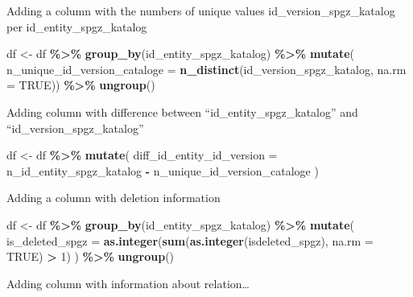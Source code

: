 \documentclass[
]{article}
\newenvironment{Shaded}{\begin{snugshade}}{\end{snugshade}}
\newcommand{\AttributeTok}[1]{\textcolor[rgb]{0.13,0.29,0.53}{#1}}
\newcommand{\ConstantTok}[1]{\textcolor[rgb]{0.56,0.35,0.01}{#1}}
\newcommand{\DecValTok}[1]{\textcolor[rgb]{0.00,0.00,0.81}{#1}}
\newcommand{\FunctionTok}[1]{\textcolor[rgb]{0.13,0.29,0.53}{\textbf{#1}}}
\newcommand{\NormalTok}[1]{#1}
\newcommand{\OtherTok}[1]{\textcolor[rgb]{0.56,0.35,0.01}{#1}}
\newcommand{\SpecialCharTok}[1]{\textcolor[rgb]{0.81,0.36,0.00}{\textbf{#1}}}
\begin{document}
Adding a column with the numbers of unique values
id\_version\_spgz\_katalog per id\_entity\_spgz\_katalog

\begin{Shaded}
\begin{Highlighting}[]
\NormalTok{df }\OtherTok{\textless{}{-}}\NormalTok{ df }\SpecialCharTok{\%\textgreater{}\%} 
  \FunctionTok{group\_by}\NormalTok{(id\_entity\_spgz\_katalog) }\SpecialCharTok{\%\textgreater{}\%} 
  \FunctionTok{mutate}\NormalTok{(}
    \AttributeTok{n\_unique\_id\_version\_cataloge =} \FunctionTok{n\_distinct}\NormalTok{(id\_version\_spgz\_katalog, }\AttributeTok{na.rm =} \ConstantTok{TRUE}\NormalTok{)) }\SpecialCharTok{\%\textgreater{}\%} 
      \FunctionTok{ungroup}\NormalTok{()}
\end{Highlighting}
\end{Shaded}

Adding column with difference between ``id\_entity\_spgz\_katalog'' and
``id\_version\_spgz\_katalog''

\begin{Shaded}
\begin{Highlighting}[]
\NormalTok{df }\OtherTok{\textless{}{-}}\NormalTok{ df }\SpecialCharTok{\%\textgreater{}\%} 
  \FunctionTok{mutate}\NormalTok{(}
    \AttributeTok{diff\_id\_entity\_id\_version =}\NormalTok{ n\_id\_entity\_spgz\_katalog }\SpecialCharTok{{-}}\NormalTok{ n\_unique\_id\_version\_cataloge}
\NormalTok{  )}
\end{Highlighting}
\end{Shaded}

Adding a column with deletion information

\begin{Shaded}
\begin{Highlighting}[]
\NormalTok{df }\OtherTok{\textless{}{-}}\NormalTok{ df }\SpecialCharTok{\%\textgreater{}\%} 
  \FunctionTok{group\_by}\NormalTok{(id\_entity\_spgz\_katalog) }\SpecialCharTok{\%\textgreater{}\%} 
  \FunctionTok{mutate}\NormalTok{(}
    \AttributeTok{is\_deleted\_spgz =} \FunctionTok{as.integer}\NormalTok{(}\FunctionTok{sum}\NormalTok{(}\FunctionTok{as.integer}\NormalTok{(isdeleted\_spgz), }\AttributeTok{na.rm =} \ConstantTok{TRUE}\NormalTok{) }\SpecialCharTok{\textgreater{}} \DecValTok{1}\NormalTok{)}
\NormalTok{    ) }\SpecialCharTok{\%\textgreater{}\%} 
      \FunctionTok{ungroup}\NormalTok{()}
\end{Highlighting}
\end{Shaded}

Adding column with information about relation\ldots{}
\end{document}
